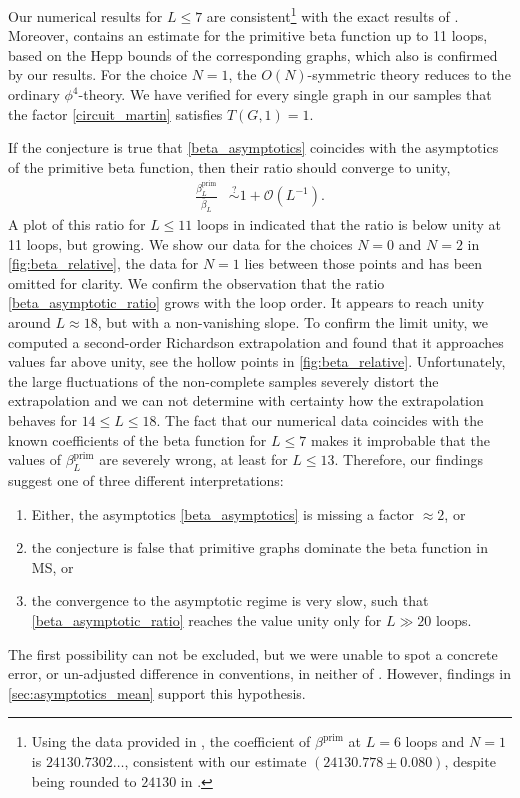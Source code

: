 \documentclass[11pt,a4paper]{article}
\renewcommand{\|}{\rule[-0.4ex]{0.2ex}{1.2em}}
\begin{document}
Our numerical results for $L \leq 7$ are consistent\footnote{Using the data provided in \cite{panzer_galois_2017}, the coefficient of  $\beta^\text{prim}$ at $L=6$ loops and $N=1$ is  $24130.7302\ldots$, consistent with our estimate $(24130.778 \pm 0.080)$, despite being rounded to $24130$ in \cite{kompaniets_minimally_2017}.} with the exact results of  \cite{kompaniets_minimally_2017}.
Moreover, \cite[Appendix B]{kompaniets_minimally_2017} contains an estimate for the primitive beta function up to 11 loops, based on the Hepp bounds of the corresponding graphs, which also is confirmed by our results. 
For the choice $N=1$, the $O(N)$-symmetric theory reduces to the ordinary $\phi^4$-theory. We have verified for every single graph in our samples that the factor \cref{circuit_martin} satisfies $T(G,1)=1$.




If the conjecture is true that \cref{beta_asymptotics} coincides with the asymptotics of the primitive beta function, then their ratio should converge to unity,
\begin{align}\label{beta_asymptotic_ratio}
\frac{\beta^{\text{prim}}_L}{\bar \beta_L} &\overset ?\sim 1 + \mathcal O\left( L^{-1} \right) .
\end{align}
A plot of this ratio for $L \leq 11$ loops in  \cite[Figure 1]{kompaniets_minimally_2017} indicated that the ratio is below unity at 11 loops, but growing. We show our data for the choices $N=0$ and $N=2$ in \cref{fig:beta_relative}, the data for $N=1$ lies between those points and has been omitted for clarity. We confirm the observation that the ratio \cref{beta_asymptotic_ratio} grows with the loop order. It appears to reach unity around $L\approx 18$, but with a non-vanishing slope. To confirm the limit unity, we computed a second-order Richardson extrapolation and found that it approaches values far above unity, see the hollow points in \cref{fig:beta_relative}. Unfortunately, the large fluctuations of  the non-complete samples   severely distort the extrapolation and we   can not  determine with certainty how the extrapolation behaves for $14 \leq L \leq 18$. The fact that our numerical data coincides with the known coefficients of the beta function for $L \leq 7$ makes it improbable that the values of $\beta^\text{prim}_L$ are severely wrong, at least for $L \leq 13$. Therefore, our findings suggest one of three different interpretations: 
\begin{enumerate}
	\item Either,   the asymptotics \cref{beta_asymptotics} is missing a factor $\approx 2$, or
	\item the conjecture is false that primitive graphs dominate the beta function in MS,  or
	\item  the convergence to the asymptotic regime is very slow, such that \cref{beta_asymptotic_ratio} reaches the value unity only for $L\gg 20$ loops.
\end{enumerate}
The first possibility can not be excluded, but we were unable to spot a concrete error, or un-adjusted difference in conventions, in neither of \cite{mckane_nonperturbative_1984,mckane_perturbation_2019,kompaniets_minimally_2017}.  However, findings in \cref{sec:asymptotics_mean} support this hypothesis. 
\end{document}

